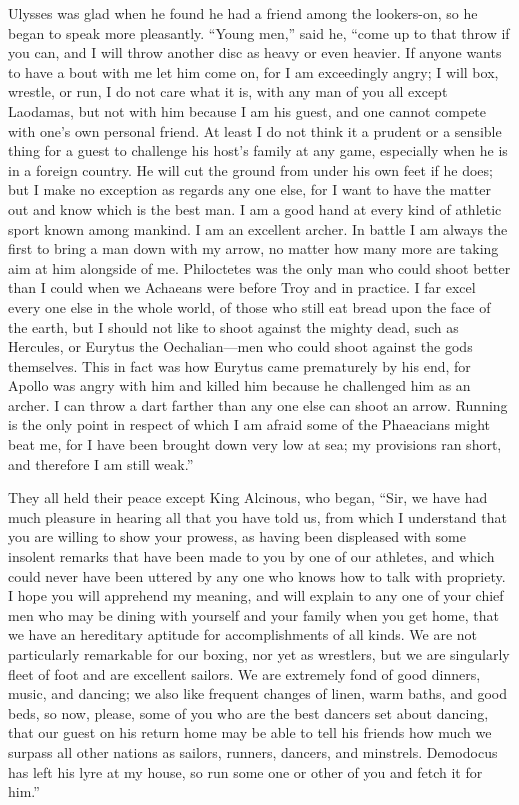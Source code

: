 Ulysses was glad when he found he had a friend among the lookers-on, so he
began to speak more pleasantly. “Young men,” said he, “come up to that throw if
you can, and I will throw another disc as heavy or even heavier. If anyone
wants to have a bout with me let him come on, for I am exceedingly angry; I
will box, wrestle, or run, I do not care what it is, with any man of you all
except Laodamas, but not with him because I am his guest, and one cannot
compete with one’s own personal friend. At least I do not think it a prudent or
a sensible thing for a guest to challenge his host’s family at any game,
especially when he is in a foreign country. He will cut the ground from under
his own feet if he does; but I make no exception as regards any one else, for I
want to have the matter out and know which is the best man. I am a good hand at
every kind of athletic sport known among mankind. I am an excellent archer. In
battle I am always the first to bring a man down with my arrow, no matter how
many more are taking aim at him alongside of me. Philoctetes was the only man
who could shoot better than I could when we Achaeans were before Troy and in
practice. I far excel every one else in the whole world, of those who still eat
bread upon the face of the earth, but I should not like to shoot against the
mighty dead, such as Hercules, or Eurytus the Oechalian—men who could shoot
against the gods themselves. This in fact was how Eurytus came prematurely by
his end, for Apollo was angry with him and killed him because he challenged him
as an archer. I can throw a dart farther than any one else can shoot an arrow.
Running is the only point in respect of which I am afraid some of the
Phaeacians might beat me, for I have been brought down very low at sea; my
provisions ran short, and therefore I am still weak.”

They all held their peace except King Alcinous, who began, “Sir, we have had
much pleasure in hearing all that you have told us, from which I understand
that you are willing to show your prowess, as having been displeased with some
insolent remarks that have been made to you by one of our athletes, and which
could never have been uttered by any one who knows how to talk with propriety.
I hope you will apprehend my meaning, and will explain to any one of your chief
men who may be dining with yourself and your family when you get home, that we
have an hereditary aptitude for accomplishments of all kinds. We are not
particularly remarkable for our boxing, nor yet as wrestlers, but we are
singularly fleet of foot and are excellent sailors. We are extremely fond of
good dinners, music, and dancing; we also like frequent changes of linen, warm
baths, and good beds, so now, please, some of you who are the best dancers set
about dancing, that our guest on his return home may be able to tell his
friends how much we surpass all other nations as sailors, runners, dancers, and
minstrels. Demodocus has left his lyre at my house, so run some one or other of
you and fetch it for him.”

